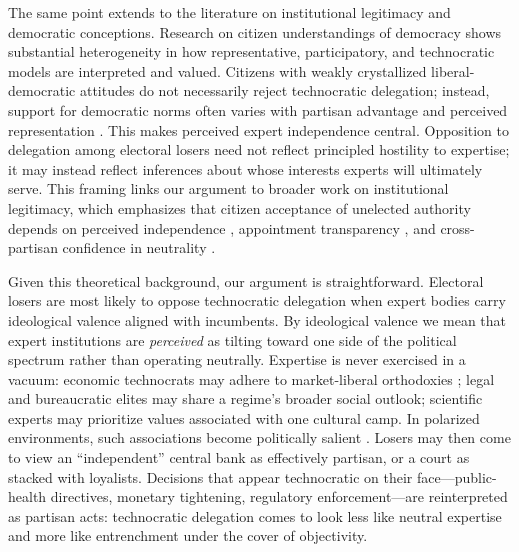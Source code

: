 \documentclass[11pt]{article}\usepackage[]{graphicx}\usepackage[]{xcolor}
\begin{document}
The same point extends to the literature on institutional legitimacy and democratic conceptions. Research on citizen understandings of democracy shows substantial heterogeneity in how representative, participatory, and technocratic models are interpreted and valued. Citizens with weakly crystallized liberal-democratic attitudes do not necessarily reject technocratic delegation; instead, support for democratic norms often varies with partisan advantage and perceived representation \parencite{Wunsch:2025}. This makes perceived expert independence central. Opposition to delegation among electoral losers need not reflect principled hostility to expertise; it may instead reflect inferences about whose interests experts will ultimately serve. This framing links our argument to broader work on institutional legitimacy, which emphasizes that citizen acceptance of unelected authority depends on perceived independence \parencite{Dellmuth:2019}, appointment transparency \parencite{Miliuviene:2024}, and cross-partisan confidence in neutrality \parencite{Angelou:2024}.

Given this theoretical background, our argument is straightforward. Electoral losers are most likely to oppose technocratic delegation when expert bodies carry ideological valence aligned with incumbents. By ideological valence we mean that expert institutions are \emph{perceived} as tilting toward one side of the political spectrum rather than operating neutrally. Expertise is never exercised in a vacuum: economic technocrats may adhere to market-liberal orthodoxies \parencite{Clarks2013,Clark2013}; legal and bureaucratic elites may share a regime's broader social outlook; scientific experts may prioritize values associated with one cultural camp. In polarized environments, such associations become politically salient \parencite[17]{Koiranen2025}. Losers may then come to view an ``independent'' central bank as effectively partisan, or a court as stacked with loyalists. Decisions that appear technocratic on their face---public-health directives, monetary tightening, regulatory enforcement---are reinterpreted as partisan acts: technocratic delegation comes to look less like neutral expertise and more like entrenchment under the cover of objectivity. 
\end{document}
